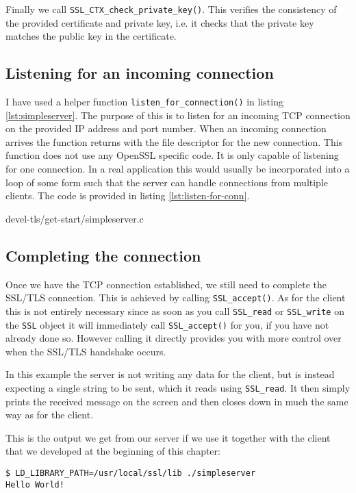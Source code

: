 Finally we call \verb!SSL_CTX_check_private_key()!. This verifies the 
consistency of the provided certificate and private key, i.e. it checks that 
the private key matches the public key in the certificate.

\subsection{Listening for an incoming connection}

I have used a helper function \verb!listen_for_connection()! in listing 
\ref{lst:simpleserver}. The purpose of this is to listen for an incoming TCP 
connection on the provided IP address and port number. When an incoming 
connection arrives the function returns with the file descriptor for the new 
connection. This function does not use any OpenSSL specific code. It is only 
capable of listening for one connection. In a real application this would 
usually be incorporated into a loop of some form such that the server can 
handle connections from multiple clients. The code is provided in listing 
\ref{lst:listen-for-conn}.


{devel-tls/get-start/simpleserver.c}

\subsection{Completing the connection}

Once we have the TCP connection established, we still need to complete the 
SSL/TLS connection. This is achieved by calling \verb!SSL_accept()!. As for the 
client this is not entirely necessary since as soon as you call \verb!SSL_read! 
or \verb!SSL_write! on the \verb!SSL! object it will immediately call 
\verb!SSL_accept()! for you, if you have not already done so. However calling 
it directly provides you with more control over when the SSL/TLS handshake 
occurs.

In this example the server is not writing any data for the client, but is 
instead expecting a single string to be sent, which it reads using 
\verb!SSL_read!. It then simply prints the received message on the screen and 
then closes down in much the same way as for the client.

This is the output we get from our server if we use it together with the client 
that we developed at the beginning of this chapter:

\begin{verbatim}
$ LD_LIBRARY_PATH=/usr/local/ssl/lib ./simpleserver 
Hello World!
\end{verbatim}

